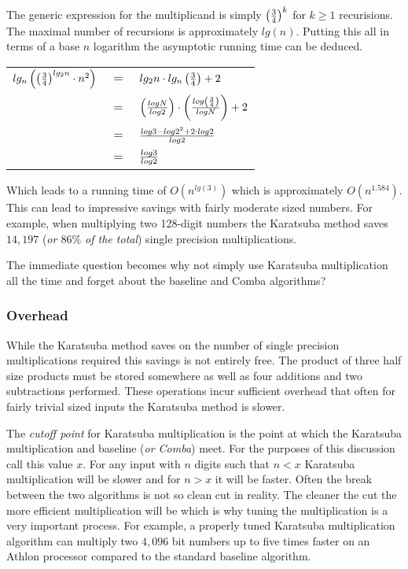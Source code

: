 \documentclass[b5paper]{book}
\begin{document}
The generic expression for the multiplicand is simply $\left ( {3 \over 4} \right )^k$ for $k \ge 1$ recurisions.  The maximal number of recursions
is approximately $lg(n)$.  Putting this all in terms of a base $n$ logarithm the asymptotic running time can be deduced.

\begin{center}
\begin{tabular}{rcl}
$lg_n \left ( \left ( {3 \over 4} \right )^{lg_2 n} \cdot n^2 \right )$ & $=$ & $lg_2 n \cdot lg_n \left ( { 3 \over 4 } \right ) + 2$ \\
                                                                        & $=$ & $\left ( {log N \over log 2} \right ) \cdot \left ( {log \left ( {3 \over 4} \right ) \over log N } \right ) + 2$ \\
                                                                        & $=$ & ${ log 3 - log 2^2 + 2 \cdot log 2} \over log 2$ \\
                                                                        & $=$ & $log 3 \over log 2$ \\
\end{tabular}
\end{center}

Which leads to a running time of $O \left ( n^{lg(3)} \right )$ which is approximately $O(n^{1.584})$.  This can lead to 
impressive savings with fairly moderate sized numbers.  For example, when multiplying two 128-digit numbers the Karatsuba 
method saves $14,197$ (\textit{or $86\%$ of the total}) single precision multiplications.  

The immediate question becomes why not simply use Karatsuba multiplication all the time and forget about the baseline and Comba algorithms? 

\subsubsection{Overhead}
While the Karatsuba method saves on the number of single precision multiplications required this savings is not entirely free.  The product
of three half size products must be stored somewhere as well as four additions and two subtractions performed.  These operations incur sufficient
overhead that often for fairly trivial sized inputs the Karatsuba method is slower.

The \textit{cutoff point} for Karatsuba multiplication is the point at which the Karatsuba multiplication and baseline (\textit{or Comba}) meet.  
For the purposes of this discussion call this value $x$.  For any input with $n$ digits such that $n < x$ Karatsuba multiplication will be slower 
and for $n > x$ it will be faster.  Often the break between the two algorithms is not so clean cut in reality.  The cleaner the cut the more 
efficient multiplication will be which is why tuning the multiplication is a very important process.  For example, a properly tuned Karatsuba 
multiplication algorithm can multiply two $4,096$ bit numbers up to five times faster on an Athlon processor compared to the standard baseline
algorithm.  
\end{document}
